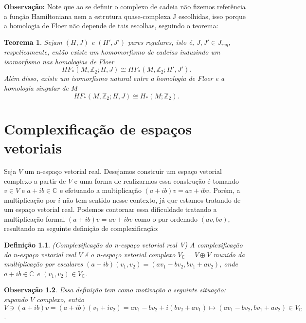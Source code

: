 \documentclass[12pt]{book}
\newtheorem{teorema}{Teorema}[section]
\newtheorem{definicao}[teorema]{Definição}
\newtheorem{observacao}[teorema]{Observação}
\newcommand{\complexificacao}[1]{#1_{\complexo{}}}
\newcommand{\complexo}[1]{\mathbb{C}^{#1}}
\newcommand{\inteiros}{\mathbb{Z}}
\begin{document}
	\textbf{Observação:} Note que ao se definir o complexo de cadeia não fizemos referência a função Hamiltoniana nem a estrutura quase-complexa J escolhidas, isso porque a homologia de Floer não depende de tais escolhas, seguindo o teorema:
	
	\begin{teorema}
		Sejam $(H,J)$ e $(H',J')$ pares regulares, isto é, $J, J' \in J_{reg}$, respeticamente, então existe um homomorfismo de cadeias induzindo um isomorfismo nas homologias de Floer
		$$
		HF_{*}(M,\inteiros_{2};H,J) \cong HF_{*}(M,\inteiros_{2};H',J'). 
		$$
		Além disso, existe um isomorfismo natural entre a homologia de Floer e a homologia singular de $M$
		$$
		HF_{*}(M,\inteiros_{2};H,J) \cong H_{*}(M;\inteiros_{2}). 
		$$
		
	\end{teorema}
	
	\appendix
	
	\chapter{Complexificação de espaços vetoriais}\label{apendice_complexificacao_espacos_vetoriais}
	
	Seja $V$ um n-espaço vetorial real. Desejamos construir um espaço vetorial complexo a partir de $V$ e uma forma de realizarmos essa construção é tomando $v \in V $ e $a+ib \in \complexo{}$ e efetuando a multiplicação $(a+ib)v = av+ibv$. Porém, a multiplicação por $i$ não tem sentido nesse contexto, já que estamos tratando de um espaço vetorial real. Podemos contornar essa dificuldade tratando a multiplicação formal $(a+ib)v = av+ibv$ como o par ordenado $(av, bv)$, resultando na seguinte definição de complexificação:
	
	\begin{definicao}
		(Complexificação do n-espaço vetorial real V) A complexificação do n-espaço vetorial real $V$ é o n-espaço vetorial complexo $\complexificacao{V}=V\oplus V$ munido da multiplicação por escalares $(a+ib)(v_{1}, v_{2}) = (av_{1}-bv_{2}, bv_{1}+ av_{2})$, onde $a+ib \in \complexo{}$ e $(v_{1}, v_{2})\in \complexificacao{V}$.
	\end{definicao}
	
	\begin{observacao}
		Essa definição tem como motivação a seguinte situação: supondo $V$ complexo, então $V \ni (a+ib)v = (a+ib)(v_{1}+iv_{2}) = av_{1}-bv_{2}+i(bv_{2}+av_{1}) \mapsto (av_{1}-bv_{2}, bv_{1}+ av_{2}) \in \complexificacao{V}$.
	\end{observacao}
	
\end{document}
